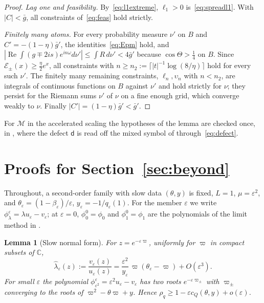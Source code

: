 \documentclass[11pt]{article}
\newtheorem{lemma}[theorem]{Lemma}
\theoremstyle{definition}
\theoremstyle{remark}
\newcommand{\C}{\mathbb C}
\newcommand{\cM}{\mathcal M}
\newcommand{\Rea}{\operatorname{Re}}
\newcommand{\cQ}{c_{Q}}
\begin{document}
\begin{proof}
\emph{Lag one and feasibility.}  By~\eqref{eq:l1extreme}, \(\ell_1>0\) is~\eqref{eq:spreadl1}.  With \(|C|<\bar g\), all
constraints of~\eqref{eq:feas} hold strictly.

\emph{Finitely many atoms.}  For every probability measure \(\nu'\) on \(B\) and
\(C'=-(1-\eta)\bar g'\), the identities~\eqref{eq:Epm} hold, and
\(|\Rea\int(g\mp2is)e^{in\omega}d\nu'|\le\int R\,d\nu'<4\bar g'\) because \(\cos\Theta>\frac14\) on \(B\).  Since
\(\mathcal E_\pm(x)\ge\frac\eta2e^x\), all constraints with \(n\ge n_2:=\lceil|t|^{-1}\log(8/\eta)\rceil\) hold for every such
\(\nu'\).  The finitely many remaining constraints, \(\ell_n,\upsilon_n\) with \(n<n_2\), are integrals of
continuous functions on \(B\) against \(\nu'\) and hold strictly for \(\nu\); they persist for the
Riemann sums \(\nu'\) of \(\nu\) on a fine enough grid, which converge weakly to \(\nu\).  Finally
\(|C'|=(1-\eta)\bar g'<\bar g'\).
\end{proof}

For \(\cM\) in the accelerated scaling the hypotheses of the lemma are checked once, in , where the
defect \(\mathsf d\) is read off the mixed symbol of  through~\eqref{eq:defect}.

%
\section{Proofs for Section~\ref{sec:beyond}}
\label{app:beyond}
%

Throughout, a second-order family with slow data \((\theta,y)\) is fixed, \(L=1\), \(\mu=\varepsilon^2\), and
\(\theta_\varepsilon=(1-\beta_\varepsilon)/\varepsilon\), \(y_\varepsilon=-1/q_\varepsilon(1)\).  For the member \(\varepsilon\) we write \(\phi^\varepsilon_\lambda=\lambda u_\varepsilon-v_\varepsilon\); at
\(\varepsilon=0\), \(\phi^0_0=\phi_0\) and \(\phi^0_1=\phi_1\) are the polynomials of the limit method in .

\begin{lemma}[Slow normal form]\label{lem:normal}
For \(z=e^{-\varepsilon\varpi}\), uniformly for \(\varpi\) in compact subsets of \(\C\),
\[
\hat\lambda_\varepsilon(z):=\frac{v_\varepsilon(z)}{u_\varepsilon(z)}=\frac{\varepsilon^2}{y_\varepsilon}\,\varpi(\theta_\varepsilon-\varpi)+O(\varepsilon^3).
\]
For small \(\varepsilon\) the polynomial \(\phi^\varepsilon_{\varepsilon^2}=\varepsilon^2u_\varepsilon-v_\varepsilon\) has two roots \(e^{-\varepsilon\varpi_\pm}\) with \(\varpi_\pm\) converging to the roots
of \(\varpi^2-\theta\varpi+y\).  Hence \(\rho_q\ge1-\varepsilon\cQ(\theta,y)+o(\varepsilon)\).
\end{lemma}
\end{document}
